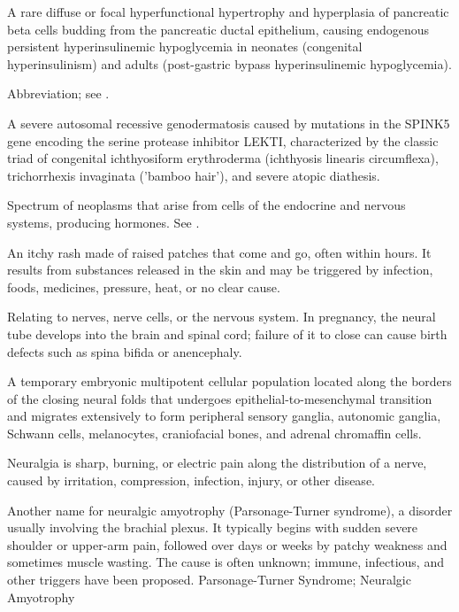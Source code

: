  A rare diffuse or focal hyperfunctional hypertrophy and hyperplasia of pancreatic beta cells budding from the pancreatic ductal epithelium, causing endogenous persistent hyperinsulinemic hypoglycemia in neonates (congenital hyperinsulinism) and adults (post-gastric bypass hyperinsulinemic hypoglycemia).

 Abbreviation; see .

 A severe autosomal recessive genodermatosis caused by mutations in the SPINK5 gene encoding the serine protease inhibitor LEKTI, characterized by the classic triad of congenital ichthyosiform erythroderma (ichthyosis linearis circumflexa), trichorrhexis invaginata ('bamboo hair'), and severe atopic diathesis.

 Spectrum of neoplasms that arise from cells of the endocrine and nervous systems, producing hormones. See .

 An itchy rash made of raised patches that come and go, often within hours. It results from substances released in the skin and may be triggered by infection, foods, medicines, pressure, heat, or no clear cause.

 Relating to nerves, nerve cells, or the nervous system. In pregnancy, the neural tube develops into the brain and spinal cord; failure of it to close can cause birth defects such as spina bifida or anencephaly.

 A temporary embryonic multipotent cellular population located along the borders of the closing neural folds that undergoes epithelial-to-mesenchymal transition and migrates extensively to form peripheral sensory ganglia, autonomic ganglia, Schwann cells, melanocytes, craniofacial bones, and adrenal chromaffin cells.

 Neuralgia is sharp, burning, or electric pain along the distribution of a nerve, caused by irritation, compression, infection, injury, or other disease.

 Another name for neuralgic amyotrophy (Parsonage-Turner syndrome), a disorder usually involving the brachial plexus. It typically begins with sudden severe shoulder or upper-arm pain, followed over days or weeks by patchy weakness and sometimes muscle wasting. The cause is often unknown; immune, infectious, and other triggers have been proposed.
\synonyms
Parsonage-Turner Syndrome; Neuralgic Amyotrophy

